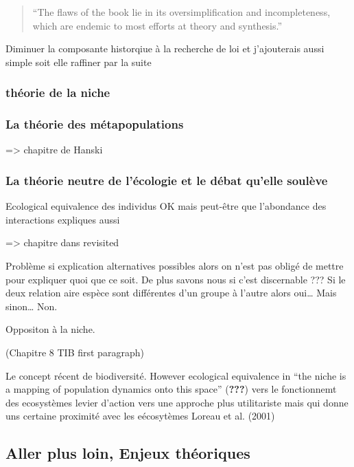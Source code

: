 \begin{quote}
``The flaws of the book lie in its oversimplification and
incompleteness, which are endemic to most efforts at theory and
synthesis.''
\end{quote}

Diminuer la composante historqiue à la recherche de loi et j'ajouterais
aussi simple soit elle raffiner par la suite

\subsubsection{théorie de la niche}\label{thuxe9orie-de-la-niche}

\subsubsection{La théorie des
métapopulations}\label{la-thuxe9orie-des-muxe9tapopulations}

=\textgreater{} chapitre de Hanski

\subsubsection{La théorie neutre de l'écologie et le débat qu'elle
soulève}\label{la-thuxe9orie-neutre-de-luxe9cologie-et-le-duxe9bat-quelle-souluxe8ve}

Ecological equivalence des individus OK mais peut-être que l'abondance
des interactions expliques aussi

=\textgreater{} chapitre dans revisited

Problème si explication alternatives possibles alors on n'est pas obligé
de mettre pour expliquer quoi que ce soit. De plus savons nous si c'est
discernable ??? Si le deux relation aire espèce sont différentes d'un
groupe à l'autre alors oui\ldots{} Mais sinon\ldots{} Non.

Oppositon à la niche.

(Chapitre 8 TIB first paragraph)

Le concept récent de biodiversité. However ecological equivalence in
``the niche is a mapping of population dynamics onto this space''
({\textbf{???}}) vers le fonctionnemt des ecosystèmes levier d'action
vers une approche plus utilitariste mais qui donne uns certaine
proximité avec les eécosytèmes Loreau et al. (2001)

\subsection{Aller plus loin, Enjeux
théoriques}\label{aller-plus-loin-enjeux-thuxe9oriques}

